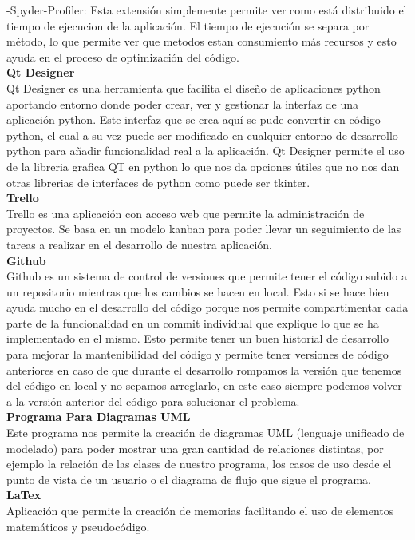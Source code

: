 \documentclass[12pt, letterpaper, twoside]{article}
\begin{document}
-Spyder-Profiler: Esta extensión simplemente permite ver como está distribuido el tiempo de ejecucion de la aplicación. El tiempo de ejecución se separa por método, lo que permite ver que metodos estan consumiento más recursos y esto ayuda en el proceso de optimización del código.\\
{\textbf{Qt Designer}}\\
Qt Designer es una herramienta que facilita el diseño de aplicaciones python aportando entorno donde poder crear, ver y gestionar la interfaz de una aplicación python. Este interfaz que se crea aquí se pude convertir en código python, el cual a su vez puede ser modificado en cualquier entorno de desarrollo python para añadir funcionalidad real a la aplicación. Qt Designer permite el uso de la libreria grafica QT en python lo que nos da opciones útiles que no nos dan otras librerias de interfaces de python como puede ser tkinter.\\
{\textbf{Trello}}\\
Trello es una aplicación con acceso web que permite la administración de proyectos. Se basa en un modelo kanban para poder llevar un seguimiento de las tareas a realizar en el desarrollo de nuestra aplicación.\\
{\textbf{Github}}\\
Github es un sistema de control de versiones que permite tener el código subido a un repositorio mientras que los cambios se hacen en local. Esto si se hace bien ayuda mucho en el desarrollo del código porque nos permite compartimentar cada parte de la funcionalidad en un commit individual que explique lo que se ha implementado en el mismo. Esto permite tener un buen historial de desarrollo para mejorar la mantenibilidad del código y permite tener versiones de código anteriores en caso de que durante el desarrollo rompamos la versión que tenemos del código en local y no sepamos arreglarlo, en este caso siempre podemos volver a la versión anterior del código para solucionar el problema.\\
{\textbf{Programa Para Diagramas UML}}\\
Este programa nos permite la creación de diagramas UML (lenguaje unificado de modelado) para poder mostrar una gran cantidad de relaciones distintas, por ejemplo la relación de las clases de nuestro programa, los casos de uso desde el punto de vista de un usuario o el diagrama de flujo que sigue el programa.\\
{\textbf{LaTex}}\\
Aplicación que permite la creación de memorias facilitando el uso de elementos matemáticos y pseudocódigo.\\
\pagebreak
\end{document}
